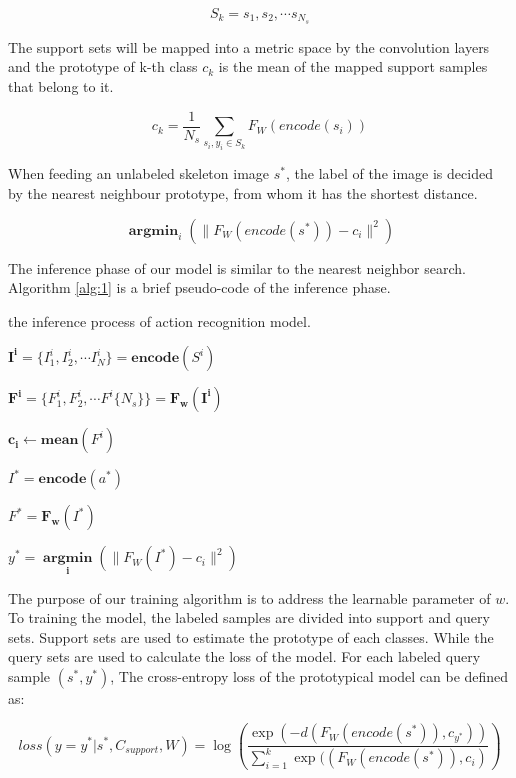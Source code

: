 \documentclass{bmvc2k}
\begin{document}
$$S_k=s_1,s_2,\cdots s_{N_s}$$

The support sets will be mapped into a metric space by the convolution layers and the prototype of k-th class $c_k$ is the mean of the mapped support samples that belong to it. 

$$c_k=\frac{1}{N_s} \sum \limits_{s_i,y_i\in S_k}F_W (encode(s_i))$$

When feeding an unlabeled skeleton image $s^*$, the label of the image is decided by the nearest neighbour prototype, from whom it has the shortest distance.

$$\mathop{\mathbf{argmin}}_{i} ( \lVert F_W ( encode(s^\ast) ) - c_i \rVert^2 )$$

The inference phase of our model is similar to the nearest neighbor search. Algorithm \ref{alg:1} is a brief pseudo-code of the inference phase.


\begin{algorithm}
	\caption{ the inference process of action recognition model.}
	\label{alg:1}
	{
		
		$\mathbf{I^i}=\{I^i_1,I^i_2,\cdots I^i_N\}=\mathbf{encode}(S^i)$
		
		$\mathbf{F^i}=\{F^i_1,F^i_2,\cdots F^i \{ N_s \} \}=\mathbf{F_w(I^i)}$
		
		$\mathbf{c_i}\leftarrow \mathbf{mean}(F^i)$
		
	}
	
	$I^\ast = \mathbf{encode}(a^\ast) $
	
	$F^\ast = \mathbf{F_w}(I^\ast)$
	
	$y^\ast=\mathop{\mathbf{argmin}}\limits_{\mathbf{i}} \left( \lVert F_W \left( I^\ast \right) - c_i \rVert^2 \right)$
\end{algorithm}

The purpose of our training algorithm is to address the learnable parameter of $w$. To training the model, the labeled samples are divided into support and query sets. Support sets are used to estimate the prototype of each classes. While the query sets are used to calculate the loss of the model. For each labeled query sample $(s^\ast,y^\ast)$, The cross-entropy loss of the prototypical model can be defined as:

$$loss(y=y^\ast | s^\ast,C_{support},W)=\log(\frac{\exp (-d(F_W(encode(s^\ast)),c_{y^\ast}))}{\sum_{i=1}^{k}\exp((F_W(encode(s^\ast)),c_i)})$$
\end{document}
